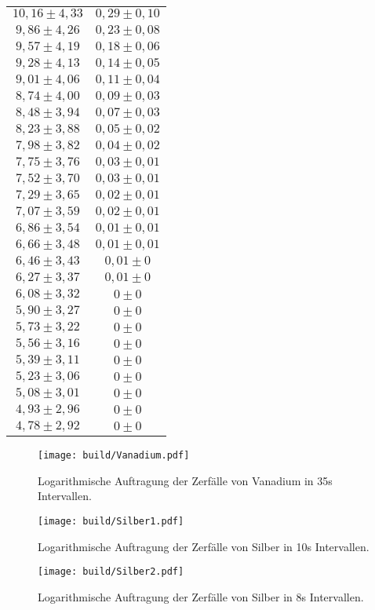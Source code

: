 \begin{table}[H]
\begin{tabular}{c c}
      $10,16 \pm 4,33$ & $0,29 \pm 0,10$ \\
      $9,86 \pm 4,26$ & $0,23 \pm 0,08$ \\
      $9,57 \pm 4,19$ & $0,18 \pm 0,06$ \\
      $9,28 \pm 4,13$ & $0,14 \pm 0,05$ \\
      $9,01 \pm 4,06$ & $0,11 \pm 0,04$ \\
      $8,74 \pm 4,00$ & $0,09 \pm 0,03$ \\
      $8,48 \pm 3,94$ & $0,07 \pm 0,03$ \\
      $8,23 \pm 3,88$ & $0,05 \pm 0,02$ \\
      $7,98 \pm 3,82$ & $0,04 \pm 0,02$ \\
      $7,75 \pm 3,76$ & $0,03 \pm 0,01$ \\
      $7,52 \pm 3,70$ & $0,03 \pm 0,01$ \\
      $7,29 \pm 3,65$ & $0,02 \pm 0,01$ \\
      $7,07 \pm 3,59$ & $0,02 \pm 0,01$ \\
      $6,86 \pm 3,54$ & $0,01 \pm 0,01$ \\
      $6,66 \pm 3,48$ & $0,01 \pm 0,01$ \\
      $6,46 \pm 3,43$ & $0,01 \pm 0$ \\
      $6,27 \pm 3,37$ & $0,01 \pm 0$ \\
      $6,08 \pm 3,32$ & $0 \pm 0$ \\
      $5,90 \pm 3,27$ & $0 \pm 0$ \\
      $5,73 \pm 3,22$ & $0 \pm 0$ \\
      $5,56 \pm 3,16$ & $0 \pm 0$ \\
      $5,39 \pm 3,11$ & $0 \pm 0$ \\
      $5,23 \pm 3,06$ & $0 \pm 0$ \\
      $5,08 \pm 3,01$ & $0 \pm 0$ \\
      $4,93 \pm 2,96$ & $0 \pm 0$ \\
      $4,78 \pm 2,92$ & $0 \pm 0$ \\      
      \bottomrule
  \end{tabular}
\end{table}

\begin{figure}[H]
  \centering
  \texttt{[image: build/Vanadium.pdf]}
  \caption{Logarithmische Auftragung der Zerfälle von Vanadium in 35s Intervallen.}
  \label{fig:Van}
\end{figure}

\begin{figure}[H]
  \centering
  \texttt{[image: build/Silber1.pdf]}
  \caption{Logarithmische Auftragung der Zerfälle von Silber in 10s Intervallen.}
  \label{fig:Si1}
\end{figure}

\begin{figure}[H]
  \centering
  \texttt{[image: build/Silber2.pdf]}
  \caption{Logarithmische Auftragung der Zerfälle von Silber in 8s Intervallen.}
  \label{fig:Si2}
\end{figure}


